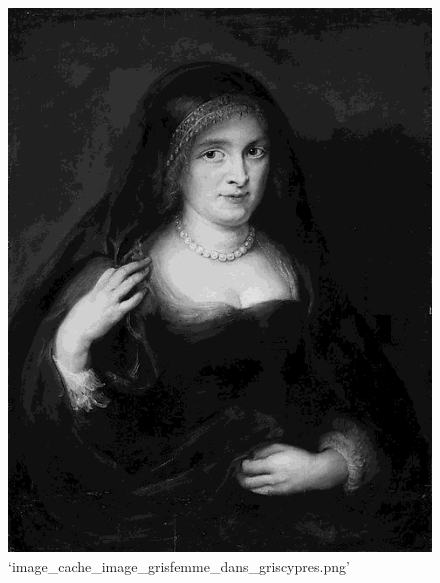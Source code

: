 \documentclass[11pt]{article}
\makeatletter
\def\maxwidth{\ifdim\Gin@nat@width>\linewidth\linewidth
    \else\Gin@nat@width\fi}
\let\Oldincludegraphics\includegraphics
\renewcommand{\includegraphics}[1]{\Oldincludegraphics[width=.8\maxwidth]{#1}}
\makeatother
\begin{document}
\begin{figure}
\centering
\includegraphics{image_cache_image_grisfemme_dans_griscypres.png}
\caption{`image\_cache\_image\_grisfemme\_dans\_griscypres.png'}
\end{figure}
\end{document}
